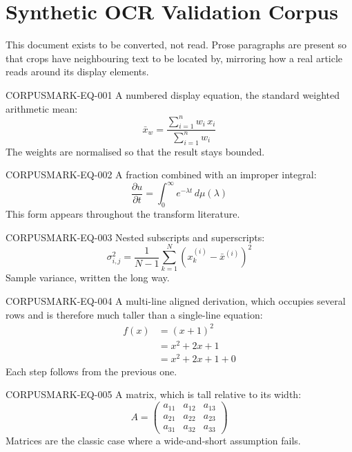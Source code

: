 \documentclass[11pt,a4paper]{article}
\begin{document}
\section*{Synthetic OCR Validation Corpus}

This document exists to be converted, not read. Prose paragraphs are present so that crops have
neighbouring text to be located by, mirroring how a real article reads around its display
elements.


CORPUSMARK-EQ-001 A numbered display equation, the standard weighted arithmetic mean:
\begin{equation}
\bar{x}_{w} = \frac{\sum_{i=1}^{n} w_i\, x_i}{\sum_{i=1}^{n} w_i}
\end{equation}
The weights are normalised so that the result stays bounded.

CORPUSMARK-EQ-002 A fraction combined with an improper integral:
\begin{equation}
\frac{\partial u}{\partial t} = \int_{0}^{\infty} e^{-\lambda t}\, d\mu(\lambda)
\end{equation}
This form appears throughout the transform literature.

CORPUSMARK-EQ-003 Nested subscripts and superscripts:
\begin{equation}
\sigma^{2}_{i,j} = \frac{1}{N-1}\sum_{k=1}^{N}\left(x_{k}^{(i)} - \bar{x}^{(i)}\right)^{2}
\end{equation}
Sample variance, written the long way.

CORPUSMARK-EQ-004 A multi-line aligned derivation, which occupies several rows and is therefore
much taller than a single-line equation:
\begin{align}
f(x) &= (x+1)^{2} \\
     &= x^{2} + 2x + 1 \\
     &= x^{2} + 2x + 1 + 0
\end{align}
Each step follows from the previous one.

CORPUSMARK-EQ-005 A matrix, which is tall relative to its width:
\begin{equation}
A = \begin{pmatrix}
a_{11} & a_{12} & a_{13} \\
a_{21} & a_{22} & a_{23} \\
a_{31} & a_{32} & a_{33}
\end{pmatrix}
\end{equation}
Matrices are the classic case where a wide-and-short assumption fails.
\end{document}
